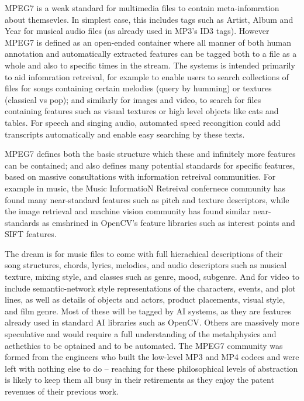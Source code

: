\documentclass[oneside,english]{scrbook}
\begin{document}
MPEG7 is a weak standard for multimedia files to contain meta-infomration about themsevles.  In simplest case, this includes tags such as Artist, Album and Year for musical audio files (as already used in MP3's ID3 tags).  However MPEG7 is defined as an open-ended container where all manner of both human annotation and automatically extracted features can be tagged both to a file as a whole and also to specific times in the stream.  The systems is intended primarily to aid infomration retreival, for example to enable users to search collections of files for songs containing certain melodies (query by humming) or textures (classical vs pop); and similarly for images and video, to search for files containing features such as visual textures or high level objects like cats and tables.   For speech and singing audio, automated speed recongition could add transcripts automatically and enable easy searching by these texts.

MPEG7 defines both the basic structure which these and infinitely more features can be contained; and also defines many potential standards for specific features, based on massive consultations with information retreival communities.   For example in music, the Music InformatioN Retreival confernece community has found many near-standard features such as pitch and texture descriptors, while the image retrieval and machine vision community has found similar near-standards as emshrined in OpenCV's feature libraries such as interest points and SIFT features.

The dream is for music files to come with full hierachical descriptions of their song structures, chords, lyrics, melodies, and audio descriptors such as musical texture, mixing style, and classes such as genre, mood, subgenre.   And for video to include semantic-network style representations of the characters, events, and plot lines, as well as details of objects and actors, product placements, visual style, and film genre.  Most of these will be tagged by AI systems, as they are features already used in standard AI libraries such as OpenCV.   Others are massively more speculative and would require a full understanding of the metahphysics and aethethics to be optained and to be automated.   The MPEG7 community was formed from the engineers who built the low-level MP3 and MP4 codecs and were left with nothing else to do -- reaching for these philosophical levels of abstraction is likely to keep them all busy in their retirements as they enjoy the patent revenues of their previous work.
\end{document}

